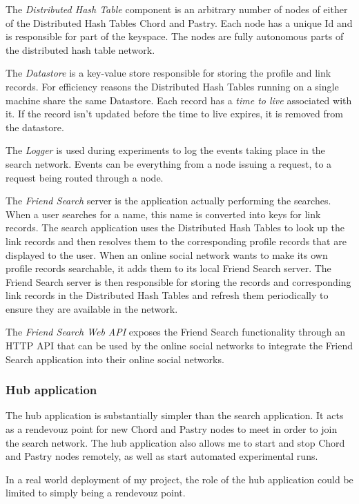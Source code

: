The \emph{Distributed Hash Table} component is an arbitrary number of nodes of either of the Distributed Hash Tables Chord and Pastry. Each node has a unique Id and is responsible for part of the keyspace. The nodes are fully autonomous parts of the distributed hash table network.

The \emph{Datastore} is a key-value store responsible for storing the profile and link records. For efficiency reasons the Distributed Hash Tables running on a single machine share the same Datastore. Each record has a \emph{time to live} associated with it. If the record isn't updated before the time to live expires, it is removed from the datastore.

The \emph{Logger} is used during experiments to log the events taking place in the search network. Events can be everything from a node issuing a request, to a request being routed through a node.

The \emph{Friend Search} server is the application actually performing the searches. When a user searches for a name, this name is converted into keys for link records. The search application uses the Distributed Hash Tables to look up the link records and then resolves them to the corresponding profile records that are displayed to the user.
When an online social network wants to make its own profile records searchable, it adds them to its local Friend Search server. The Friend Search server is then responsible for storing the records and corresponding link records in the Distributed Hash Tables and refresh them periodically to ensure they are available in the network.

The \emph{Friend Search Web API} exposes the Friend Search functionality through an HTTP API that can be used by the online social networks to integrate the Friend Search application into their online social networks.

\subsubsection{Hub application}
The hub application is substantially simpler than the search application. It acts as a rendevouz point for new Chord and Pastry nodes to meet in order to join the search network. The hub application also allows me to start and stop Chord and Pastry nodes remotely, as well as start automated experimental runs.

In a real world deployment of my project, the role of the hub application could be limited to simply being a rendevouz point.

